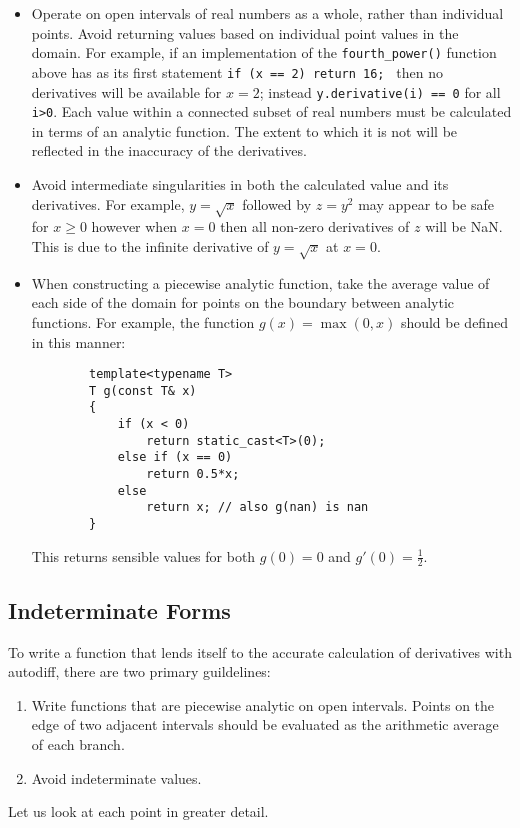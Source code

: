 \documentclass{article}
\begin{document}
\begin{itemize}
\item Operate on open intervals of real numbers as a whole, rather than individual points.  Avoid
returning values based on individual point values in the domain.  For example, if an implementation of the
{\tt fourth\_power()} function above has as its first statement {\tt if (x == 2) return 16; } then no
derivatives will be available for $x=2$; instead {\tt y.derivative(i) == 0} for all {\tt i>0}. Each value within a
connected subset of real numbers must be calculated in terms of an analytic function. The extent to which it is not
will be reflected in the inaccuracy of the derivatives.
\item Avoid intermediate singularities in both the calculated value and its derivatives. For example, $y=\sqrt{x}$
followed by $z=y^2$ may appear to be safe for $x\ge0$ however when $x=0$ then all non-zero derivatives of $z$ will
be NaN. This is due to the infinite derivative of $y=\sqrt{x}$ at $x=0$.
\item When constructing a piecewise analytic function, take the average value of each side of the domain for points
on the boundary between analytic functions. For example, the function $g(x) = \max(0,x)$ should be
defined in this manner:
    \begin{verbatim}
        template<typename T>
        T g(const T& x)
        {
            if (x < 0)
                return static_cast<T>(0);
            else if (x == 0)
                return 0.5*x;
            else
                return x; // also g(nan) is nan
        }
    \end{verbatim}
This returns sensible values for both $g(0)=0$ and $g'(0)=\frac{1}{2}$.
\end{itemize}

\subsection{Indeterminate Forms}

To write a function that lends itself to the accurate calculation of derivatives with autodiff,
there are two primary guildelines:

\begin{enumerate}
\item Write functions that are piecewise analytic on open intervals. Points on the edge of two adjacent intervals
    should be evaluated as the arithmetic average of each branch.
\item Avoid indeterminate values.
\end{enumerate}
Let us look at each point in greater detail.
\end{document}
